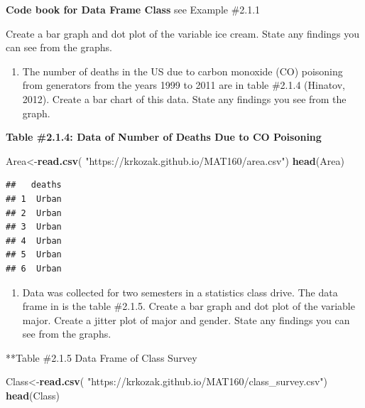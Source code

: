 \documentclass[
]{book}
\newenvironment{Shaded}{\begin{snugshade}}{\end{snugshade}}
\newcommand{\KeywordTok}[1]{\textcolor[rgb]{0.13,0.29,0.53}{\textbf{#1}}}
\newcommand{\NormalTok}[1]{#1}
\newcommand{\StringTok}[1]{\textcolor[rgb]{0.31,0.60,0.02}{#1}}
\providecommand{\tightlist}{%
  \setlength{\itemsep}{0pt}\setlength{\parskip}{0pt}}
\begin{document}
\textbf{Code book for Data Frame Class} see Example \#2.1.1

Create a bar graph and dot plot of the variable ice cream. State any findings you can see from the graphs.

\begin{enumerate}
\def\labelenumi{\arabic{enumi}.}
\setcounter{enumi}{2}
\tightlist
\item
  The number of deaths in the US due to carbon monoxide (CO) poisoning from generators from the years 1999 to 2011 are in table \#2.1.4 (Hinatov, 2012). Create a bar chart of this data. State any findings you see from the graph.
\end{enumerate}

\textbf{Table \#2.1.4: Data of Number of Deaths Due to CO Poisoning}

\begin{Shaded}
\begin{Highlighting}[]
\NormalTok{Area<-}\KeywordTok{read.csv}\NormalTok{(}
  \StringTok{"https://krkozak.github.io/MAT160/area.csv"}\NormalTok{)}
\KeywordTok{head}\NormalTok{(Area)}
\end{Highlighting}
\end{Shaded}

\begin{verbatim}
##   deaths
## 1  Urban
## 2  Urban
## 3  Urban
## 4  Urban
## 5  Urban
## 6  Urban
\end{verbatim}

\begin{enumerate}
\def\labelenumi{\arabic{enumi}.}
\setcounter{enumi}{3}
\tightlist
\item
  Data was collected for two semesters in a statistics class drive. The data frame in is the table \#2.1.5. Create a bar graph and dot plot of the variable major. Create a jitter plot of major and gender. State any findings you can see from the graphs.
\end{enumerate}

**Table \#2.1.5 Data Frame of Class Survey

\begin{Shaded}
\begin{Highlighting}[]
\NormalTok{Class<-}\KeywordTok{read.csv}\NormalTok{(}
  \StringTok{"https://krkozak.github.io/MAT160/class_survey.csv"}\NormalTok{)}
\KeywordTok{head}\NormalTok{(Class)}
\end{Highlighting}
\end{Shaded}
\end{document}
